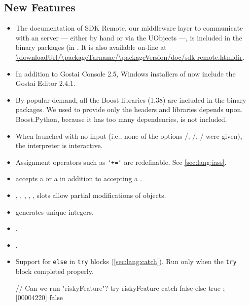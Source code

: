 \subsection{New Features}
\begin{itemize}
\item The documentation of \urbi SDK Remote, our middleware layer to
  communicate with an \urbi server --- either by hand or via the UObjects
  ---, is included in the binary packages (in
  .  It is also
  available on-line at
  \url{\downloadUrl/\packageTarname/\packageVersion/doc/sdk-remote.htmldir}.

\item In addition to Gostai Console 2.5, Windows installers of \usdk now
  include the Gostai Editor 2.4.1.

\item By popular demand, all the Boost libraries (1.38) are included in the
  binary packages.  We used to provide only the headers and libraries \usdk
  depends upon.  Boost.Python, because it has too many dependencies, is not
  included.

\item When launched with no input (i.e., none of the options
  /, /,
  / were given), the interpreter is interactive.

\item Assignment operators such as \lstinline|'+='| are redefinable.  See
  \autoref{sec:lang:iass}.

\item {} accepts a  or a
   in addition to accepting a .

\item {}, , ,
  , , 
  slots allow partial modifications of  objects.

\item {} generates unique integers.

\item {}.

\item {}.

\item Support for \lstinline|else| in \lstinline|try| blocks
  (\autoref{sec:lang:catch}).  Run only when the \lstinline|try|
  block completed properly.
\begin{urbiscript}
// Can we run "riskyFeature"?
try { riskyFeature } catch { false } else { true };
[00004220] false


\end{urbiscript}
\end{itemize}
